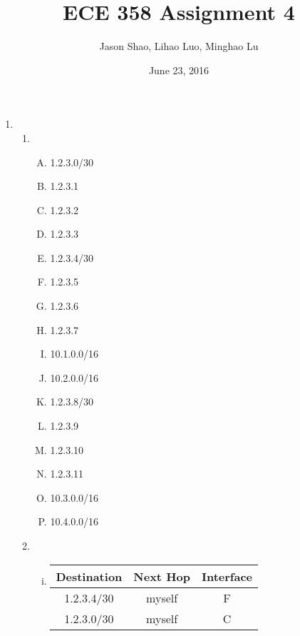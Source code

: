 \documentclass[12pt]{article}
\title{ECE 358 Assignment 4}
\author{Jason Shao, Lihao Luo, Minghao Lu}
\date{June 23, 2016}
\begin{document}
\maketitle
\renewcommand{\thesubsection}{Problem \arabic{subsection}}


\def\question#1{\item[\bf #1.]}
\def\part#1{\item[\bf #1)]}
\newcommand{\pc}[1]{\mbox{\textbf{#1}}} %

\begin{enumerate}
	 \item \begin{enumerate}
        \item \begin{enumerate}[(A)]
            \item 1.2.3.0/30
            \item 1.2.3.1
            \item 1.2.3.2
            \item 1.2.3.3
            \item 1.2.3.4/30
            \item 1.2.3.5
            \item 1.2.3.6
            \item 1.2.3.7
            \item 10.1.0.0/16
            \item 10.2.0.0/16
            \item 1.2.3.8/30
            \item 1.2.3.9
            \item 1.2.3.10
            \item 1.2.3.11
            \item 10.3.0.0/16
            \item 10.4.0.0/16
        \end{enumerate}
    \item \begin{enumerate}[(i)]
        \item
            \begin{tabular}{ |c|c|c| } 
             \hline
             Destination & Next Hop & Interface \\ 
             \hline
             1.2.3.4/30 & myself & F \\
             \hline
             1.2.3.0/30 & myself & C \\

\end{tabular}
\end{enumerate}
\end{enumerate}
\end{enumerate}
\end{document}
